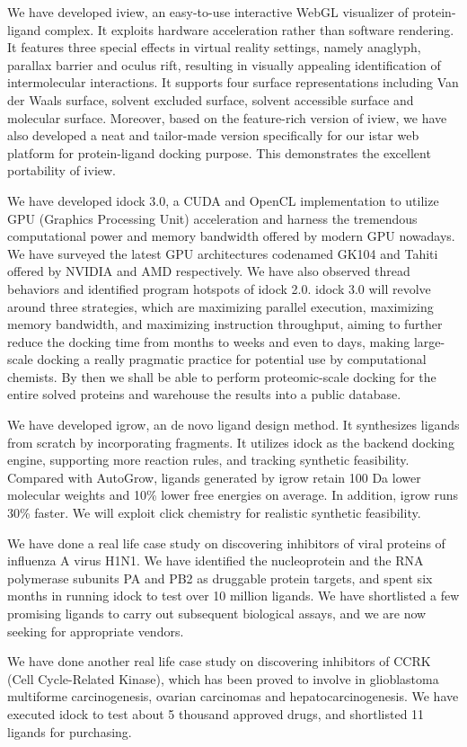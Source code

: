 We have developed iview, an easy-to-use interactive WebGL visualizer of protein-ligand complex. It exploits hardware acceleration rather than software rendering. It features three special effects in virtual reality settings, namely anaglyph, parallax barrier and oculus rift, resulting in visually appealing identification of intermolecular interactions. It supports four surface representations including Van der Waals surface, solvent excluded surface, solvent accessible surface and molecular surface. Moreover, based on the feature-rich version of iview, we have also developed a neat and tailor-made version specifically for our istar web platform for protein-ligand docking purpose. This demonstrates the excellent portability of iview.

We have developed idock 3.0, a CUDA and OpenCL implementation to utilize GPU (Graphics Processing Unit) acceleration and harness the tremendous computational power and memory bandwidth offered by modern GPU nowadays. We have surveyed the latest GPU architectures codenamed GK104 and Tahiti offered by NVIDIA and AMD respectively. We have also observed thread behaviors and identified program hotspots of idock 2.0. idock 3.0 will revolve around three strategies, which are maximizing parallel execution, maximizing memory bandwidth, and maximizing instruction throughput, aiming to further reduce the docking time from months to weeks and even to days, making large-scale docking a really pragmatic practice for potential use by computational chemists. By then we shall be able to perform proteomic-scale docking for the entire solved proteins and warehouse the results into a public database.

We have developed igrow, an de novo ligand design method. It synthesizes ligands from scratch by incorporating fragments. It utilizes idock as the backend docking engine, supporting more reaction rules, and tracking synthetic feasibility. Compared with AutoGrow, ligands generated by igrow retain 100 Da lower molecular weights and 10\% lower free energies on average. In addition, igrow runs 30\% faster. We will exploit click chemistry for realistic synthetic feasibility.

We have done a real life case study on discovering inhibitors of viral proteins of influenza A virus H1N1. We have identified the nucleoprotein and the RNA polymerase subunits PA and PB2 as druggable protein targets, and spent six months in running idock to test over 10 million ligands. We have shortlisted a few promising ligands to carry out subsequent biological assays, and we are now seeking for appropriate vendors.

We have done another real life case study on discovering inhibitors of CCRK (Cell Cycle-Related Kinase), which has been proved to involve in glioblastoma multiforme carcinogenesis, ovarian carcinomas and hepatocarcinogenesis. We have executed idock to test about 5 thousand approved drugs, and shortlisted 11 ligands for purchasing.
